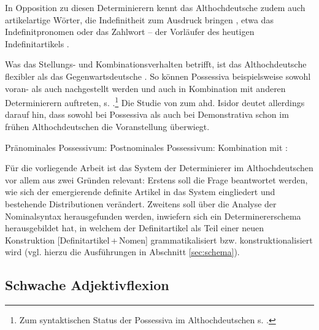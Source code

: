 In Opposition zu diesen  Determinierern kennt das Althochdeutsche zudem auch artikelartige Wörter, die Indefinitheit zum Ausdruck bringen \parencite[vgl. z.B.][253f.]{Braune2004}, etwa das Indefinitpronomen  \parencite{Donhauser2012} oder das Zahlwort  -- der Vorläufer des heutigen Indefinitartikels \parencite{Oubouzar2000,Szczepaniak2016a}. 

Was das Stellungs- und Kombinationsverhalten betrifft, ist das Althochdeutsche  flexibler als das Gegenwartsdeutsche \parencite[vgl.][104]{Szczepaniak2011a}. So können Possessiva beispielsweise sowohl voran- als auch nachgestellt werden und auch in Kombination mit anderen Determinierern auftreten, s.  \parencite[Beispiele aus][27f.]{Schrodt2004}.\footnote{Zum syntaktischen Status der Possessiva im Althochdeutschen s. \textcite[132ff.]{Demske2001}.} Die Studie von \textcite{Flick2018} zum ahd. Isidor deutet allerdings darauf hin, dass sowohl bei Possessiva als auch bei Demonstrativa schon im frühen Althochdeutschen die Voranstellung überwiegt.

\begin{exe}
	\ex \label{ex:poss-stellung}   
	\begin{xlist}
		\ex \label{ex:possvor} Pränominales Possessivum:  
		\ex \label{ex:possnach} Postnominales Possessivum:   
		\ex \label{ex:posskombi} Kombination mit :  
		\end{xlist}
\end{exe}


Für die vorliegende Arbeit ist das System der Determinierer im Althochdeutschen  vor allem aus zwei Gründen relevant: Erstens soll die Frage beantwortet werden, wie sich der emergierende definite Artikel in das System eingliedert und bestehende Distributionen verändert. Zweitens soll über die Analyse der Nominalsyntax herausgefunden werden, inwiefern sich ein Determinererschema herausgebildet hat, in welchem der Definitartikel als Teil einer neuen Konstruktion [Definitartikel\,+\,Nomen] grammatikalisiert bzw. konstruktionalisiert wird (vgl. hierzu die Ausführungen in Abschnitt \ref{sec:schema}). 

\subsection{Schwache Adjektivflexion} \label{schwache-Adjektivflexion}

